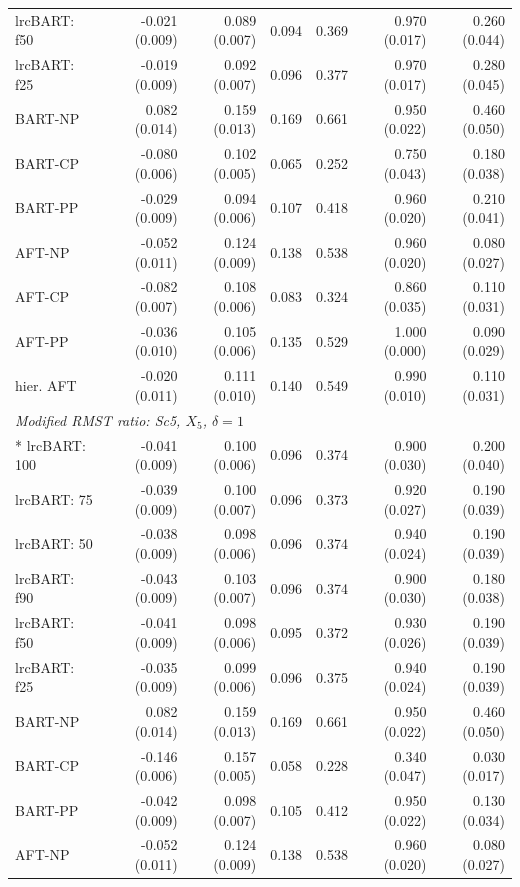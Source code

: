 \begin{landscape}
\begin{longtable}{lrrrrrr}
lrcBART: f50 & -0.021 (0.009) & 0.089 (0.007) & 0.094 & 0.369 & 0.970 (0.017) & 0.260 (0.044) \\
lrcBART: f25 & -0.019 (0.009) & 0.092 (0.007) & 0.096 & 0.377 & 0.970 (0.017) & 0.280 (0.045) \\
BART-NP & 0.082 (0.014) & 0.159 (0.013) & 0.169 & 0.661 & 0.950 (0.022) & 0.460 (0.050) \\
BART-CP & -0.080 (0.006) & 0.102 (0.005) & 0.065 & 0.252 & 0.750 (0.043) & 0.180 (0.038) \\
BART-PP & -0.029 (0.009) & 0.094 (0.006) & 0.107 & 0.418 & 0.960 (0.020) & 0.210 (0.041) \\
AFT-NP & -0.052 (0.011) & 0.124 (0.009) & 0.138 & 0.538 & 0.960 (0.020) & 0.080 (0.027) \\
AFT-CP & -0.082 (0.007) & 0.108 (0.006) & 0.083 & 0.324 & 0.860 (0.035) & 0.110 (0.031) \\
AFT-PP & -0.036 (0.010) & 0.105 (0.006) & 0.135 & 0.529 & 1.000 (0.000) & 0.090 (0.029) \\
hier. AFT & -0.020 (0.011) & 0.111 (0.010) & 0.140 & 0.549 & 0.990 (0.010) & 0.110 (0.031) \\
\multicolumn{7}{l}{\strut\textit{Modified RMST ratio: Sc5, $X_5$, $\delta=1$}}\\*
lrcBART: 100 & -0.041 (0.009) & 0.100 (0.006) & 0.096 & 0.374 & 0.900 (0.030) & 0.200 (0.040) \\
lrcBART: 75 & -0.039 (0.009) & 0.100 (0.007) & 0.096 & 0.373 & 0.920 (0.027) & 0.190 (0.039) \\
lrcBART: 50 & -0.038 (0.009) & 0.098 (0.006) & 0.096 & 0.374 & 0.940 (0.024) & 0.190 (0.039) \\
lrcBART: f90 & -0.043 (0.009) & 0.103 (0.007) & 0.096 & 0.374 & 0.900 (0.030) & 0.180 (0.038) \\
lrcBART: f50 & -0.041 (0.009) & 0.098 (0.006) & 0.095 & 0.372 & 0.930 (0.026) & 0.190 (0.039) \\
lrcBART: f25 & -0.035 (0.009) & 0.099 (0.006) & 0.096 & 0.375 & 0.940 (0.024) & 0.190 (0.039) \\
BART-NP & 0.082 (0.014) & 0.159 (0.013) & 0.169 & 0.661 & 0.950 (0.022) & 0.460 (0.050) \\
BART-CP & -0.146 (0.006) & 0.157 (0.005) & 0.058 & 0.228 & 0.340 (0.047) & 0.030 (0.017) \\
BART-PP & -0.042 (0.009) & 0.098 (0.007) & 0.105 & 0.412 & 0.950 (0.022) & 0.130 (0.034) \\
AFT-NP & -0.052 (0.011) & 0.124 (0.009) & 0.138 & 0.538 & 0.960 (0.020) & 0.080 (0.027) \\

\end{longtable}
\end{landscape}
